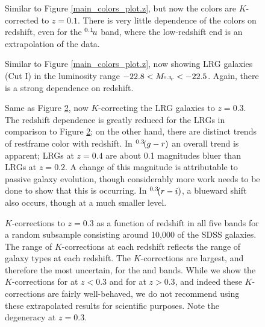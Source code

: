 \clearpage
{}
\begin{figure}
\figurenum{\fignum}
\caption{\label{main_colors_plot} Similar to Figure
\ref{main_colors_plot.z}, but now the colors are $K$-corrected to
$z=0.1$.  There is very little dependence of the colors on redshift,
even for the $^{{0.1}}\!{u}$ band, where the low-redshift end is an
extrapolation of the data.}
\end{figure}

\clearpage
{}
\begin{figure}
\figurenum{\fignum}
\caption{\label{lrg_colors_plot.z} Similar to Figure
\ref{main_colors_plot.z}, now showing LRG galaxies (Cut I) in the
luminosity range $-22.8<M_{^{{0.3}}\!{r}}<-22.5$. Again, there is a
strong dependence on redshift.}
\end{figure}

\clearpage
{}
\begin{figure}
\figurenum{\fignum}
\caption{\label{lrg_colors_plot} Same as Figure
\ref{lrg_colors_plot.z}, now $K$-correcting the LRG galaxies to
$z=0.3$.  The redshift dependence is greatly reduced for the LRGs in
comparison to Figure \ref{lrg_colors_plot.z}; on the other hand, there
are distinct trends of restframe color with redshift.  In
$^{{0.3}}\!{(g-r)}$ an overall trend is apparent; LRGs at $z=0.4$ are
about 0.1 magnitudes bluer than LRGs at $z=0.2$. A change of this
magnitude is attributable to passive galaxy evolution, though
considerably more work needs to be done to show that this is
occurring. In $^{{0.3}}\!{(r-i)}$, a blueward shift also occurs,
though at a much smaller level.}
\end{figure}

\clearpage
{}
\begin{figure}
\figurenum{\fignum}
\caption{\label{k_kcorrect_plot} $K$-corrections to $z=0.3$ as a
function of redshift in all five bands for a random subsample
consisting around 10,000 of the SDSS galaxies.  The range of
$K$-corrections at each redshift reflects the range of galaxy types at
each redshift.  The $K$-corrections are largest, and therefore the
most uncertain, for the  and  bands. While
we show the $K$-corrections for  at $z<0.3$ and for
 at $z>0.3$, and indeed these $K$-corrections are fairly
well-behaved, we do not recommend using these extrapolated results for
scientific purposes. Note the degeneracy at $z=0.3$.}
\end{figure}

